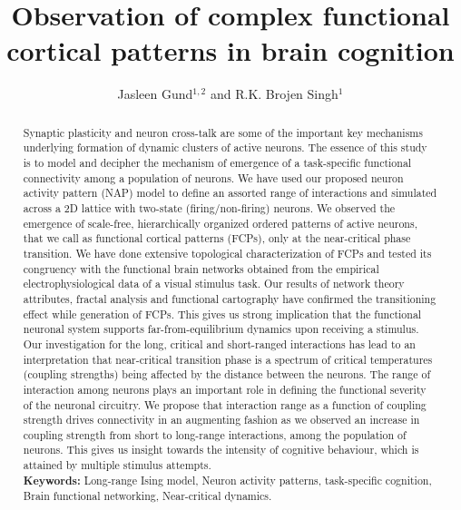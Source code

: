 \documentclass[preprintnumbers,amsmath,amssymb,onecolumn]{revtex4}
\begin{document}
\title{Observation of complex functional cortical patterns in brain cognition}
\author{Jasleen Gund$^{1,2}$ and R.K. Brojen Singh$^1$}

\begin{abstract}
{\noindent}Synaptic plasticity and neuron cross-talk are some of the important key mechanisms underlying formation of dynamic clusters of active neurons. The essence of this study is to model and decipher the mechanism of emergence of a task-specific functional connectivity among a population of neurons. We have used our proposed neuron activity pattern (NAP) model to define an assorted range of interactions and simulated across a 2D lattice with two-state (firing/non-firing) neurons. We observed the emergence of scale-free, hierarchically organized ordered patterns of active neurons, that we call as functional cortical patterns (FCPs), only at the near-critical phase transition. We have done extensive topological characterization of FCPs and tested its congruency with the functional brain networks obtained from the empirical electrophysiological data of a visual stimulus task. Our results of network theory attributes, fractal analysis and functional cartography have confirmed the transitioning effect while generation of FCPs. This gives us strong implication that the functional neuronal system supports far-from-equilibrium dynamics upon receiving a stimulus. Our investigation for the long, critical and short-ranged interactions has lead to an interpretation that near-critical transition phase is a spectrum of critical temperatures (coupling strengths) being affected by the distance between the neurons. The range of interaction among neurons plays an important role in defining the functional severity of the neuronal circuitry. We propose that interaction range as a function of coupling strength drives connectivity in an augmenting fashion as we observed an increase in coupling strength from short to long-range interactions, among the population of neurons. This gives us insight towards the intensity of cognitive behaviour, which is attained by multiple stimulus attempts.\\

\noindent\textbf{Keywords:} Long-range Ising model, Neuron activity patterns, task-specific cognition, Brain functional networking,  Near-critical dynamics.
\end{abstract}
 
\end{document}
